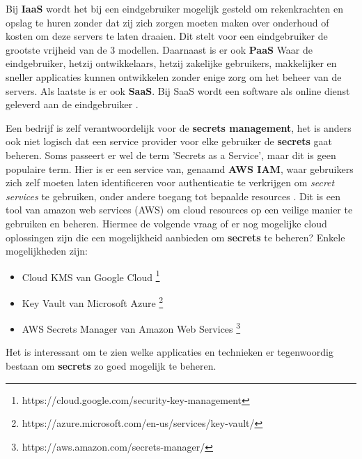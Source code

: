 Bij \textbf{IaaS} wordt het bij een eindgebruiker mogelijk gesteld om rekenkrachten en opslag te huren zonder dat zij zich zorgen moeten maken over onderhoud of kosten om deze servers te laten draaien. Dit stelt voor een eindgebruiker de grootste vrijheid van de 3 modellen. Daarnaast is er ook \textbf{PaaS} Waar de eindgebruiker, hetzij ontwikkelaars, hetzij zakelijke gebruikers, makkelijker en sneller applicaties kunnen ontwikkelen zonder enige zorg om het beheer van de servers. 
Als laatste is er ook \textbf{SaaS}. Bij SaaS wordt een software als online dienst geleverd aan de eindgebruiker \autocite{hurwitz2020cloud}. 

Een bedrijf is zelf verantwoordelijk voor de \textbf{secrets management}, het is anders ook niet logisch dat een service provider voor elke gebruiker de \textbf{secrets} gaat beheren. Soms passeert er wel de term 'Secrets as a Service', maar dit is geen populaire term. Hier is er een service van, genaamd \textbf{AWS IAM}, waar gebruikers zich zelf moeten laten identificeren voor authenticatie te verkrijgen om \textit{secret services} te gebruiken, onder andere toegang tot bepaalde resources \autocite{thoughtworks2019}. Dit is een tool van amazon web services (AWS) om cloud resources op een veilige manier te gebruiken en beheren. Hiermee de volgende vraag of er nog mogelijke cloud oplossingen zijn die een mogelijkheid aanbieden om \textbf{secrets} te beheren? Enkele mogelijkheden zijn:

\begin{itemize}
    \item Cloud KMS van Google Cloud \footnote{https://cloud.google.com/security-key-management}
    \item Key Vault van Microsoft Azure \footnote{https://azure.microsoft.com/en-us/services/key-vault/}
    \item AWS Secrets Manager van Amazon Web Services \footnote{https://aws.amazon.com/secrets-manager/}
\end{itemize}

Het is interessant om te zien welke applicaties en technieken er tegenwoordig bestaan om \textbf{secrets} zo goed mogelijk te beheren.


